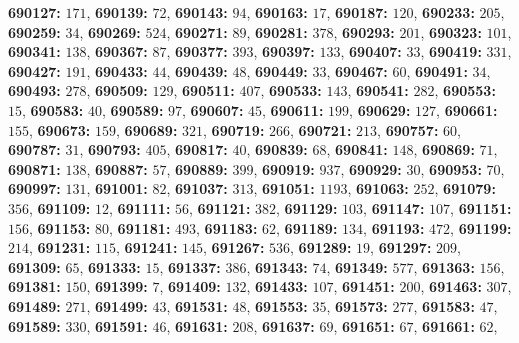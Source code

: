 \textsf{\bfseries 690127:} $171$, \textsf{\bfseries 690139:} $72$, \textsf{\bfseries 690143:} $94$, \textsf{\bfseries 690163:} $17$, \textsf{\bfseries 690187:} $120$, \textsf{\bfseries 690233:} $205$, \textsf{\bfseries 690259:} $34$, \textsf{\bfseries 690269:} $524$, \textsf{\bfseries 690271:} $89$, \textsf{\bfseries 690281:} $378$, \textsf{\bfseries 690293:} $201$, \textsf{\bfseries 690323:} $101$, \textsf{\bfseries 690341:} $138$, \textsf{\bfseries 690367:} $87$, \textsf{\bfseries 690377:} $393$, \textsf{\bfseries 690397:} $133$, \textsf{\bfseries 690407:} $33$, \textsf{\bfseries 690419:} $331$, \textsf{\bfseries 690427:} $191$, \textsf{\bfseries 690433:} $44$, \textsf{\bfseries 690439:} $48$, \textsf{\bfseries 690449:} $33$, \textsf{\bfseries 690467:} $60$, \textsf{\bfseries 690491:} $34$, \textsf{\bfseries 690493:} $278$, \textsf{\bfseries 690509:} $129$, \textsf{\bfseries 690511:} $407$, \textsf{\bfseries 690533:} $143$, \textsf{\bfseries 690541:} $282$, \textsf{\bfseries 690553:} $15$, \textsf{\bfseries 690583:} $40$, \textsf{\bfseries 690589:} $97$, \textsf{\bfseries 690607:} $45$, \textsf{\bfseries 690611:} $199$, \textsf{\bfseries 690629:} $127$, \textsf{\bfseries 690661:} $155$, \textsf{\bfseries 690673:} $159$, \textsf{\bfseries 690689:} $321$, \textsf{\bfseries 690719:} $266$, \textsf{\bfseries 690721:} $213$, \textsf{\bfseries 690757:} $60$, \textsf{\bfseries 690787:} $31$, \textsf{\bfseries 690793:} $405$, \textsf{\bfseries 690817:} $40$, \textsf{\bfseries 690839:} $68$, \textsf{\bfseries 690841:} $148$, \textsf{\bfseries 690869:} $71$, \textsf{\bfseries 690871:} $138$, \textsf{\bfseries 690887:} $57$, \textsf{\bfseries 690889:} $399$, \textsf{\bfseries 690919:} $937$, \textsf{\bfseries 690929:} $30$, \textsf{\bfseries 690953:} $70$, \textsf{\bfseries 690997:} $131$, \textsf{\bfseries 691001:} $82$, \textsf{\bfseries 691037:} $313$, \textsf{\bfseries 691051:} $1193$, \textsf{\bfseries 691063:} $252$, \textsf{\bfseries 691079:} $356$, \textsf{\bfseries 691109:} $12$, \textsf{\bfseries 691111:} $56$, \textsf{\bfseries 691121:} $382$, \textsf{\bfseries 691129:} $103$, \textsf{\bfseries 691147:} $107$, \textsf{\bfseries 691151:} $156$, \textsf{\bfseries 691153:} $80$, \textsf{\bfseries 691181:} $493$, \textsf{\bfseries 691183:} $62$, \textsf{\bfseries 691189:} $134$, \textsf{\bfseries 691193:} $472$, \textsf{\bfseries 691199:} $214$, \textsf{\bfseries 691231:} $115$, \textsf{\bfseries 691241:} $145$, \textsf{\bfseries 691267:} $536$, \textsf{\bfseries 691289:} $19$, \textsf{\bfseries 691297:} $209$, \textsf{\bfseries 691309:} $65$, \textsf{\bfseries 691333:} $15$, \textsf{\bfseries 691337:} $386$, \textsf{\bfseries 691343:} $74$, \textsf{\bfseries 691349:} $577$, \textsf{\bfseries 691363:} $156$, \textsf{\bfseries 691381:} $150$, \textsf{\bfseries 691399:} $7$, \textsf{\bfseries 691409:} $132$, \textsf{\bfseries 691433:} $107$, \textsf{\bfseries 691451:} $200$, \textsf{\bfseries 691463:} $307$, \textsf{\bfseries 691489:} $271$, \textsf{\bfseries 691499:} $43$, \textsf{\bfseries 691531:} $48$, \textsf{\bfseries 691553:} $35$, \textsf{\bfseries 691573:} $277$, \textsf{\bfseries 691583:} $47$, \textsf{\bfseries 691589:} $330$, \textsf{\bfseries 691591:} $46$, \textsf{\bfseries 691631:} $208$, \textsf{\bfseries 691637:} $69$, \textsf{\bfseries 691651:} $67$, \textsf{\bfseries 691661:} $62$, 
